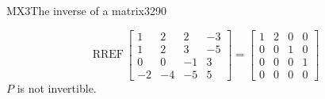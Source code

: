 \begin{exercise}{MX3}{The inverse of a matrix}{3290}
\begin{exerciseAnswer}
 

 \[\mathrm{RREF}\,\left[\begin{array}{cccc}
1 & 2 & 2 & -3 \\
1 & 2 & 3 & -5 \\
0 & 0 & -1 & 3 \\
-2 & -4 & -5 & 5
\end{array}\right]=\left[\begin{array}{cccc}
1 & 2 & 0 & 0 \\
0 & 0 & 1 & 0 \\
0 & 0 & 0 & 1 \\
0 & 0 & 0 & 0
\end{array}\right]\] \(P\) is not invertible. 

 \end{exerciseAnswer}
 \end{exercise}


